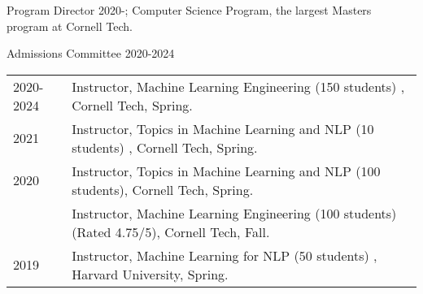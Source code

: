 \documentclass[10pt]{article}
\begin{document}
{\ind Program Director 2020-; Computer Science Program, the largest Masters program at Cornell Tech.

\ind Admissions Committee 2020-2024
\bigskip



\hspace{-1cm} \begin{tabular}{lp{11.5cm}}
	2020-2024 & \ind  Instructor, Machine Learning Engineering (150 students) , Cornell Tech, Spring.                                                                       \\
	2021      & \ind  Instructor, Topics in Machine Learning and NLP (10 students) , Cornell Tech, Spring.                                                                  \\
	2020      & \ind  Instructor, Topics in Machine Learning and NLP (100 students), Cornell Tech, Spring.                                                                  \\
	          & \ind  Instructor,  Machine Learning Engineering (100 students) (Rated 4.75/5), Cornell Tech, Fall.                                                          \\

	2019      & \ind  Instructor, Machine Learning for NLP (50 students) , Harvard University, Spring.                                                                      \\


\end{tabular}}
\end{document}
